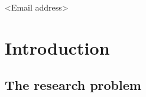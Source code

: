 \documentclass[british]{emisa}
\begin{document}
\begin{article}{%
  \title{}
  \subtitle{}
  \author*{<Name>}{<Email address>}
  \address{address line 1\\address line 2}
  \author{Name}
  \address[a]{}
  \abstract{}
  \acknowledgements{}
  
  }
\section{Introduction}
\subsection{The research problem}
\printbibliography
\end{article}
\end{document}
